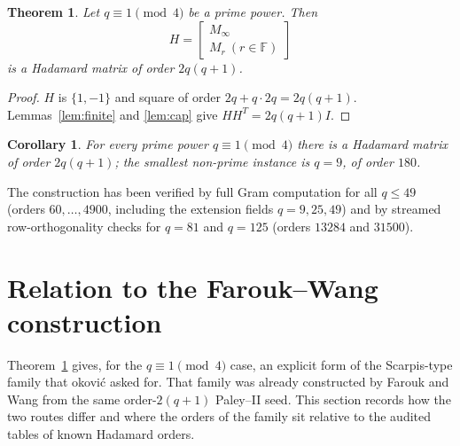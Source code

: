 \documentclass[11pt]{article}
\newtheorem{theorem}{Theorem}
\newtheorem{corollary}{Corollary}
\newcommand{\F}{\mathbb F}
\begin{document}
\begin{theorem}\label{thm:main}
Let \(q\equiv1\pmod4\) be a prime power.  Then
\[
        H=\begin{bmatrix}M_\infty\\ M_r\ (r\in\F)\end{bmatrix}
\]
is a Hadamard matrix of order \(2q(q+1)\).
\end{theorem}

\begin{proof}
\(H\) is \(\{1,-1\}\) and square of order \(2q+q\cdot2q=2q(q+1)\).
Lemmas~\ref{lem:finite} and \ref{lem:cap} give
\(HH^{T}=2q(q+1)I\).
\end{proof}

\begin{corollary}
For every prime power \(q\equiv1\pmod4\) there is a Hadamard matrix of
order \(2q(q+1)\); the smallest non-prime instance is \(q=9\), of order
\(180\).
\end{corollary}

The construction has been verified by full Gram computation for all
\(q\le49\) (orders \(60,\dots,4900\), including the extension fields
\(q=9,25,49\)) and by streamed row-orthogonality checks for \(q=81\) and
\(q=125\) (orders \(13284\) and \(31500\)).

\section{Relation to the Farouk--Wang construction}

Theorem~\ref{thm:main} gives, for the \(q\equiv1\pmod4\) case, an
explicit form of the Scarpis-type family that \DJ okovi\'c
\cite{Djokovic2016} asked for.  That family was already constructed by
Farouk and Wang \cite{FaroukWang2020,FaroukWang2022} from the same
order-\(2(q+1)\) Paley--II seed.  This section records how the two
routes differ and where the orders of the family sit relative to the
audited tables of known Hadamard orders.
\end{document}
